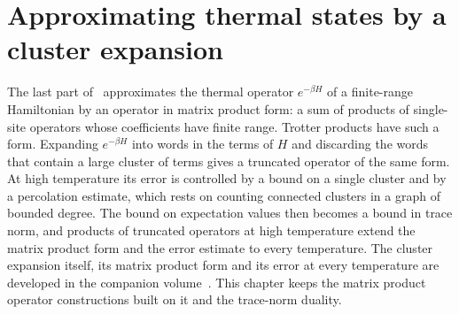 \chapter{Approximating thermal states by a cluster expansion}
\label{ch:hastings_cluster_expansion}

The last part of~\cite{Hastings2006Solving} approximates the thermal
operator $e^{-\beta H}$ of a finite-range Hamiltonian by an operator in
matrix product form: a sum of products of single-site operators whose
coefficients have finite range. Trotter products have such a form. Expanding
$e^{-\beta H}$ into words in the terms of $H$ and discarding the words that
contain a large cluster of terms gives a truncated operator of the same form.
At high temperature its error is controlled by a bound on a single cluster
and by a percolation estimate, which rests on counting connected clusters in
a graph of bounded degree. The bound on expectation values then becomes a
bound in trace norm, and products of truncated operators at high temperature
extend the matrix product form and the error estimate to every temperature.
The cluster expansion itself, its matrix product form and its error at every
temperature are developed in the companion
volume~\cite[``The high-temperature cluster expansion'']{QICLean2026Blueprint}.
This chapter keeps the matrix product operator constructions built on it and
the trace-norm duality.







